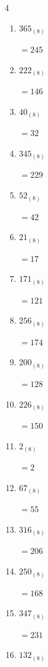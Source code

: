 \begin{multicols}{4}
\begin{enumerate}
        $=210$

  \item $365_{(8)}$

        $=245$

  \item $222_{(8)}$

        $=146$

  \item $40_{(8)}$

        $=32$

  \item $345_{(8)}$

        $=229$

  \item $52_{(8)}$

        $=42$

  \item $21_{(8)}$

        $=17$

  \item $171_{(8)}$

        $=121$

  \item $256_{(8)}$

        $=174$

\columnbreak %

\resetques

  \item $200_{(8)}$

        $=128$

  \item $226_{(8)}$

        $=150$

  \item $2_{(8)}$

        $=2$

  \item $67_{(8)}$

        $=55$

  \item $316_{(8)}$

        $=206$

  \item $250_{(8)}$

        $=168$

  \item $347_{(8)}$

        $=231$

  \item $132_{(8)}$


\end{enumerate}
\end{multicols}
